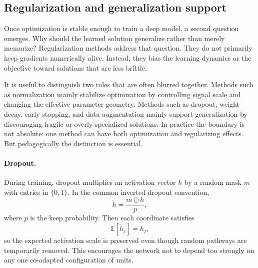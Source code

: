 \subsection*{Regularization and generalization support}

Once optimization is stable enough to train a deep model, a second question emerges.
Why should the learned solution generalize rather than merely memorize?
Regularization methods address that question.
They do not primarily keep gradients numerically alive.
Instead, they bias the learning dynamics or the objective toward solutions that are less brittle.

\begin{remark}
It is useful to distinguish two roles that are often blurred together.
Methods such as normalization mainly stabilize optimization by controlling signal scale and changing the effective parameter geometry.
Methods such as dropout, weight decay, early stopping, and data augmentation mainly support generalization by discouraging fragile or overly specialized solutions.
In practice the boundary is not absolute: one method can have both optimization and regularizing effects.
But pedagogically the distinction is essential.
\end{remark}

\paragraph{Dropout.}
During training, dropout multiplies an activation vector $h$ by a random mask $m$ with entries in $\{0,1\}$.
In the common inverted-dropout convention,
\[
\widetilde h = \frac{m\odot h}{p},
\]
where $p$ is the keep probability.
Then each coordinate satisfies
\[
\mathbb E[\widetilde h_j]=h_j,
\]
so the expected activation scale is preserved even though random pathways are temporarily removed.
This encourages the network not to depend too strongly on any one co-adapted configuration of units.

